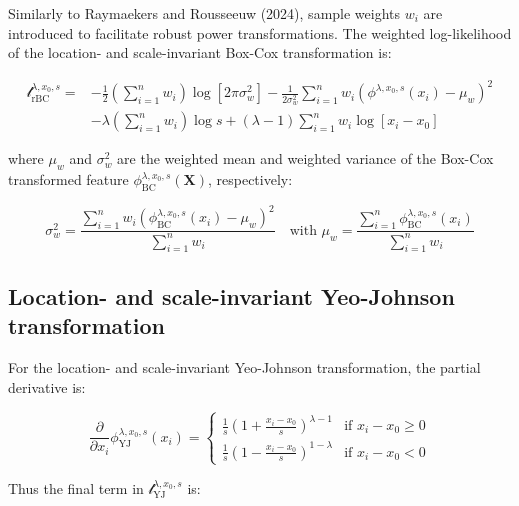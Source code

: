 \documentclass[preprint,12pt,authoryear]{elsarticle}
\begin{document}
Similarly to Raymaekers and Rousseeuw (2024), sample weights \(w_i\) are
introduced to facilitate robust power transformations. The weighted
log-likelihood of the location- and scale-invariant Box-Cox
transformation is:

\begin{equation}
\begin{split}
\mathcal{l}_{\text{rBC}}^{\lambda, x_0, s} = & -\frac{1}{2} \left(\sum_{i=1}^n w_i \right) \log \left[ 2 \pi \sigma_w^2 \right] -\frac{1}{2 \sigma_w^2} \sum_{i=1}^n w_i \left( \phi^{\lambda, x_0, s}(x_i) - \mu_w \right)^2 \\
& - \lambda \left( \sum_{i=1}^n w_i \right) \log s + \left( \lambda - 1 \right) \sum_{i=1}^n w_i \log \left[ x_i - x_0 \right]
\end{split}
\end{equation}

where \(\mu_w\) and \(\sigma^2_w\) are the weighted mean and weighted
variance of the Box-Cox transformed feature
\(\phi_{\text{BC}}^{\lambda, x_0, s} (\mathbf{X})\), respectively:

\begin{equation}
\sigma_w^2 = \frac{\sum_{i=1}^n w_i \left(\phi_{\text{BC}}^{\lambda, x_0, s} (x_i) - \mu_w \right)^2}{\sum_{i=1}^n w_i} \quad \text{with } \mu_w = \frac{\sum_{i=1}^n \phi_{\text{BC}}^{\lambda, x_0, s} (x_i)} {\sum_{i=1}^n w_i}
\end{equation}

\subsection{Location- and scale-invariant Yeo-Johnson
transformation}\label{location--and-scale-invariant-yeo-johnson-transformation}

For the location- and scale-invariant Yeo-Johnson transformation, the
partial derivative is:

\begin{equation}
\frac{\partial}{\partial x_i} \phi_{\text{YJ}}^{\lambda, x_0, s}(x_i) =
\begin{cases}
\frac{1}{s} \left(1 + \frac{x_i - x_0}{s}\right)^{\lambda - 1} & \text{if } x_i - x_0 \geq 0\\
\frac{1}{s} \left(1 - \frac{x_i - x_0}{s}\right)^{1 - \lambda} & \text{if } x_i - x_0 < 0
\end{cases}
\end{equation}

Thus the final term in \(\mathcal{l}_{\text{YJ}}^{\lambda, x_0, s}\) is:
\end{document}
